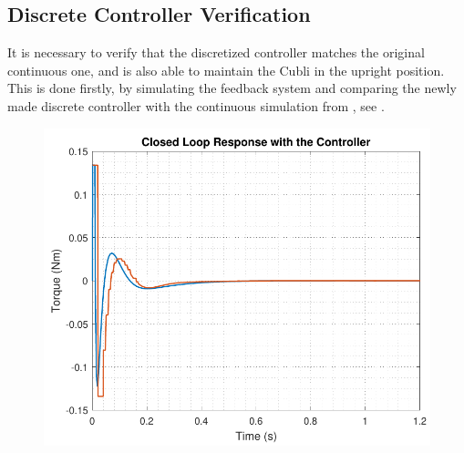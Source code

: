 \subsection{Discrete Controller Verification}\label{ssec:discreteControllerVerification}
It is necessary to verify that the discretized controller matches the original continuous one, and is also able to maintain the Cubli in the upright position. This is done firstly, by simulating the feedback system and comparing the newly made discrete controller with the continuous simulation from , see .
%
\begin{minipage}{\linewidth}
  \begin{minipage}{0.45\linewidth}
    \begin{figure}[H]
      \includegraphics[scale=.53]{figures/torqueComp.pdf}
      \centering
      \vspace{-.4cm}
      \captionsetup{justification=centering}
      \label{fig:discreteVsContinuousOutputController}
    \end{figure}\vspace{-5mm}
  \end{minipage}
  \hspace{0.03\linewidth}
  \begin{minipage}{0.45\linewidth}
    \begin{figure}[H]

\end{figure}
\end{minipage}
\end{minipage}
